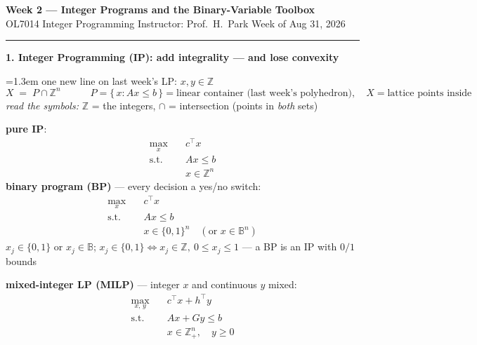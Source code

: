 \documentclass[10pt]{article}
\newcommand{\beat}[2]{%
  \par\medskip
  {\color{ruleink}\rule{\textwidth}{1pt}}\par\nobreak\vspace{2pt}
  {\large\bfseries #1.\; #2}\par\nobreak\vspace{3pt}}
\newenvironment{board}{%
  \par\vspace{2pt}
  \begingroup\leftskip=1.3em\relax}{%
  \par\endgroup\vspace{2pt}}
\begin{document}
{\Large\bfseries Week 2 --- Integer Programs and the Binary-Variable Toolbox}\\[2pt]
{\small OL7014 Integer Programming \quad\textbullet\quad Instructor: Prof.\ H.\ Park \quad\textbullet\quad Week of Aug 31, 2026}

\beat{1}{Integer Programming (IP): add integrality --- and lose convexity}
\begin{board}
one new line on last week's LP: \qquad $x, y \in \mathbb{Z}$
\[
  X \;=\; P \cap \mathbb{Z}^n
  \qquad\quad P = \{\, x : Ax \le b \,\} = \text{linear container (last week's polyhedron)}, \quad X = \text{lattice points inside}
\]
\emph{read the symbols:} \quad $\mathbb{Z}$ = the integers, \quad $\cap$ = intersection (points in \emph{both} sets)
\vspace{3pt}

\textbf{pure IP}:
\[
\begin{aligned}
  \max_{x}\quad & c^{\top}x \\
  \text{s.t.}\quad & Ax \le b \\
                   & x \in \mathbb{Z}^n
\end{aligned}
\]
\textbf{binary program (BP)} --- every decision a yes/no switch:
\[
\begin{aligned}
  \max_{x}\quad & c^{\top}x \\
  \text{s.t.}\quad & Ax \le b \\
                   & x \in \{0,1\}^n \quad (\text{or } x \in \mathbb{B}^n)
\end{aligned}
\]
\quad $x_j \in \{0,1\}$ or $x_j \in \mathbb{B}$; \quad
$x_j \in \{0,1\} \iff x_j \in \mathbb{Z}, \ 0 \le x_j \le 1$ \quad --- a BP is an IP with $0/1$ bounds
\vspace{4pt}

\textbf{mixed-integer LP (MILP)} --- integer $x$ and continuous $y$ mixed:
\[
\begin{aligned}
  \max_{x,\,y}\quad & c^{\top}x + h^{\top}y \\
  \text{s.t.}\quad & Ax + Gy \le b \\
                   & x \in \mathbb{Z}^n_{+}, \quad y \ge 0
\end{aligned}
\]
\vspace{1pt}


\end{board}
\end{document}
